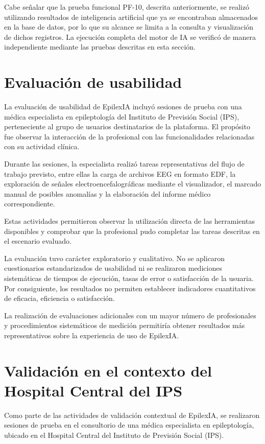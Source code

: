 Cabe señalar que la prueba funcional PF-10, descrita anteriormente, se realizó utilizando resultados de inteligencia artificial que ya se encontraban almacenados en la base de datos, por lo que su alcance se limita a la consulta y visualización de dichos registros. La ejecución completa del motor de IA se verificó de manera independiente mediante las pruebas descritas en esta sección.


\section{Evaluación de usabilidad}


La evaluación de usabilidad de EpilexIA incluyó sesiones de prueba con una médica especialista en epileptología del Instituto de Previsión Social (IPS), perteneciente al grupo de usuarios destinatarios de la plataforma. El propósito fue observar la interacción de la profesional con las funcionalidades relacionadas con su actividad clínica.

Durante las sesiones, la especialista realizó tareas representativas del flujo de trabajo previsto, entre ellas la carga de archivos EEG en formato EDF, la exploración de señales electroencefalográficas mediante el visualizador, el marcado manual de posibles anomalías y la elaboración del informe médico correspondiente.

Estas actividades permitieron observar la utilización directa de las herramientas disponibles y comprobar que la profesional pudo completar las tareas descritas en el escenario evaluado.

La evaluación tuvo carácter exploratorio y cualitativo. No se aplicaron cuestionarios estandarizados de usabilidad ni se realizaron mediciones sistemáticas de tiempos de ejecución, tasas de error o satisfacción de la usuaria. Por consiguiente, los resultados no permiten establecer indicadores cuantitativos de eficacia, eficiencia o satisfacción.

La realización de evaluaciones adicionales con un mayor número de profesionales y procedimientos sistemáticos de medición permitiría obtener resultados más representativos sobre la experiencia de uso de EpilexIA.


\section{Validación en el contexto del Hospital Central del IPS}


Como parte de las actividades de validación contextual de EpilexIA, se realizaron sesiones de prueba en el consultorio de una médica especialista en epileptología, ubicado en el Hospital Central del Instituto de Previsión Social (IPS).

